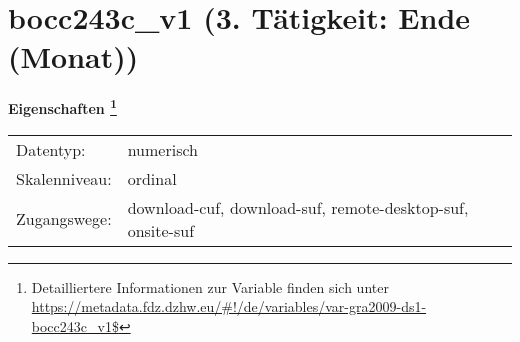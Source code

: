 
    \setcounter{footnote}{0}

    \vspace*{-1.8cm}
	\section{bocc243c\_v1 (3. Tätigkeit: Ende (Monat))}
	\label{section:bocc243c_v1}



    \vspace*{0.5cm}
    \noindent\textbf{Eigenschaften
	\footnote{Detailliertere Informationen zur Variable finden sich unter
		\url{https://metadata.fdz.dzhw.eu/\#!/de/variables/var-gra2009-ds1-bocc243c_v1$}}}\\
	\begin{tabularx}{\hsize}{@{}lX}
	Datentyp: & numerisch \\
	Skalenniveau: & ordinal \\
	Zugangswege: &
	  download-cuf, 
	  download-suf, 
	  remote-desktop-suf, 
	  onsite-suf
 \\
    \end{tabularx}



